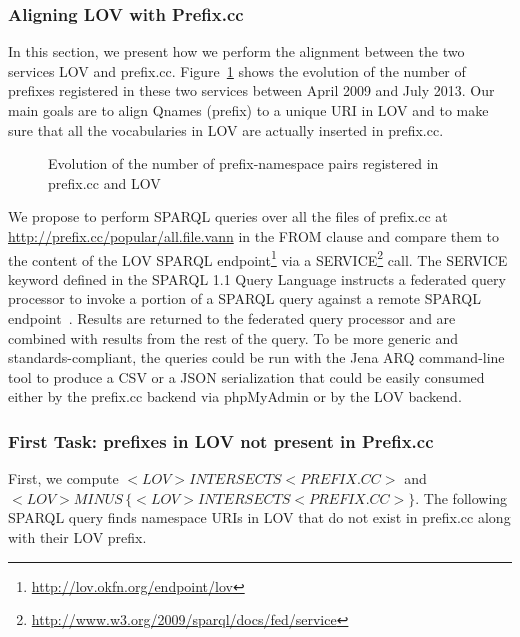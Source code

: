 \subsubsection{Aligning LOV with Prefix.cc} \label{sec:alignment}
In this section, we present how we perform the alignment between the two services LOV and prefix.cc. Figure~\ref{fig:evolution} shows the evolution of the number of prefixes registered in these two services between April 2009 and July 2013. Our main goals are to align Qnames (prefix) to a unique URI in LOV and to make sure that all the vocabularies in LOV are actually inserted in prefix.cc.

\begin{figure}[ht]
\centering
\resizebox{\textwidth}{!}{

}
\vspace{0.1cm}
\caption{Evolution of the number of prefix-namespace pairs registered in prefix.cc and LOV}
\label{fig:evolution}
\end{figure}

We propose to perform SPARQL queries over all the files of prefix.cc at\\
 \url{http://prefix.cc/popular/all.file.vann} in the FROM clause and compare them to the content of the LOV SPARQL endpoint\footnote{\url{http://lov.okfn.org/endpoint/lov}} via a SERVICE\footnote{\url{http://www.w3.org/2009/sparql/docs/fed/service}} call. The SERVICE keyword defined in the SPARQL 1.1 Query Language instructs a federated query processor to invoke a portion of a SPARQL query against a remote SPARQL endpoint~\cite{eric2013}. Results are returned to the federated query processor and are combined with results from the rest of the query. To be more generic and standards-compliant, the queries could be run with the Jena ARQ command-line tool to produce a CSV or a JSON serialization that could be easily consumed either by the prefix.cc backend via phpMyAdmin or by the LOV backend.

\subsubsection{First Task: prefixes in LOV not present in Prefix.cc}  \label{sec:notInPrefix}
First, we compute $<LOV> INTERSECTS <PREFIX.CC>$ and $<LOV> MINUS \, \{<LOV> INTERSECTS <PREFIX.CC> \}$. The following SPARQL query finds namespace URIs in LOV that do not exist in prefix.cc along with their LOV prefix.

